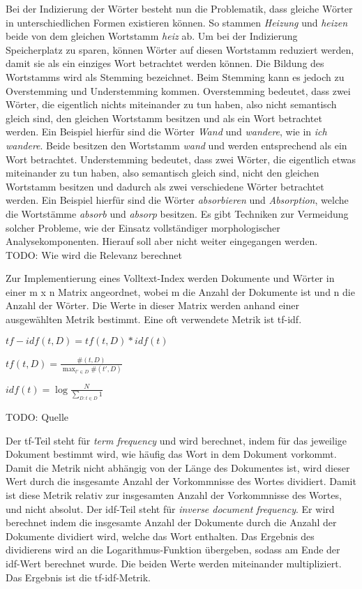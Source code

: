 Bei der Indizierung der Wörter besteht nun die Problematik, dass gleiche Wörter in unterschiedlichen Formen existieren können.
So stammen \textit{Heizung} und \textit{heizen} beide von dem gleichen Wortstamm \textit{heiz} ab.
Um bei der Indizierung Speicherplatz zu sparen, können Wörter auf diesen Wortstamm reduziert werden, damit sie als ein einziges Wort betrachtet werden können.
Die Bildung des Wortstamms wird als Stemming bezeichnet.
Beim Stemming kann es jedoch zu Overstemming und Understemming kommen.
Overstemming bedeutet, dass zwei Wörter, die eigentlich nichts miteinander zu tun haben, also nicht semantisch gleich sind, den gleichen Wortstamm besitzen und als ein Wort betrachtet werden.
Ein Beispiel hierfür sind die Wörter \textit{Wand} und \textit{wandere}, wie in \textit{ich wandere}.
Beide besitzen den Wortstamm \textit{wand} und werden entsprechend als ein Wort betrachtet.
Understemming bedeutet, dass zwei Wörter, die eigentlich etwas miteinander zu tun haben, also semantisch gleich sind, nicht den gleichen Wortstamm besitzen und dadurch als zwei verschiedene Wörter betrachtet werden.
Ein Beispiel hierfür sind die Wörter \textit{absorbieren} und \textit{Absorption}, welche die Wortstämme \textit{absorb} und \textit{absorp} besitzen.
Es gibt Techniken zur Vermeidung solcher Probleme, wie der Einsatz vollständiger morphologischer Analysekomponenten.
Hierauf soll aber nicht weiter eingegangen werden.\\

TODO: Wie wird die Relevanz berechnet

Zur Implementierung eines Volltext-Index werden Dokumente und Wörter in einer m x n Matrix angeordnet, wobei m die Anzahl der Dokumente ist und n die Anzahl der Wörter.
Die Werte in dieser Matrix werden anhand einer ausgewählten Metrik bestimmt.
Eine oft verwendete Metrik ist tf-idf.

\(tf-idf(t,D)=tf(t,D)*idf(t)\)

\(tf(t,D)=\frac {\#(t,D)}{\max _{t'\in D}\#(t',D)}\)

\(idf(t)=\log {\frac {N}{\sum_{D:t\in D}1}}\)

TODO: Quelle

Der tf-Teil steht für \textit{term frequency} und wird berechnet, indem für das jeweilige Dokument bestimmt wird, wie häufig das Wort in dem Dokument vorkommt.
Damit die Metrik nicht abhängig von der Länge des Dokumentes ist, wird dieser Wert durch die insgesamte Anzahl der Vorkommnisse des Wortes dividiert.
Damit ist diese Metrik relativ zur insgesamten Anzahl der Vorkommnisse des Wortes, und nicht absolut.
Der idf-Teil steht für \textit{inverse document frequency}.
Er wird berechnet indem die insgesamte Anzahl der Dokumente durch die Anzahl der Dokumente dividiert wird, welche das Wort enthalten.
Das Ergebnis des dividierens wird an die Logarithmus-Funktion übergeben, sodass am Ende der idf-Wert berechnet wurde.
Die beiden Werte werden miteinander multipliziert.
Das Ergebnis ist die tf-idf-Metrik.

